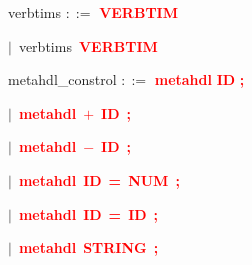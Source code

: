 \vspace{1em}
\noindent
\settowidth{\parindent}{\hspace{4ex}}
verbtims $::=$\hspace{1ex} \textbf{\textcolor{red}{VERBTIM}}

\mbox{$|$ verbtims \textbf{\textcolor{red}{VERBTIM}}}

\vspace{1em}
\noindent
\settowidth{\parindent}{\hspace{4ex}}
metahdl\_constrol $::=$\hspace{1ex} \textbf{\textcolor{red}{metahdl}} \textbf{\textcolor{red}{ID}} \textbf{\textcolor{red}{;}}

\mbox{$|$ \textbf{\textcolor{red}{metahdl}} \textbf{\textcolor{red}{$+$}} \textbf{\textcolor{red}{ID}} \textbf{\textcolor{red}{;}}}

\mbox{$|$ \textbf{\textcolor{red}{metahdl}} \textbf{\textcolor{red}{$-$}} \textbf{\textcolor{red}{ID}} \textbf{\textcolor{red}{;}}}

\mbox{$|$ \textbf{\textcolor{red}{metahdl}} \textbf{\textcolor{red}{ID}} \textbf{\textcolor{red}{=}} \textbf{\textcolor{red}{NUM}} \textbf{\textcolor{red}{;}}}

\mbox{$|$ \textbf{\textcolor{red}{metahdl}} \textbf{\textcolor{red}{ID}} \textbf{\textcolor{red}{=}} \textbf{\textcolor{red}{ID}} \textbf{\textcolor{red}{;}}}

\mbox{$|$ \textbf{\textcolor{red}{metahdl}} \textbf{\textcolor{red}{STRING}} \textbf{\textcolor{red}{;}}}
